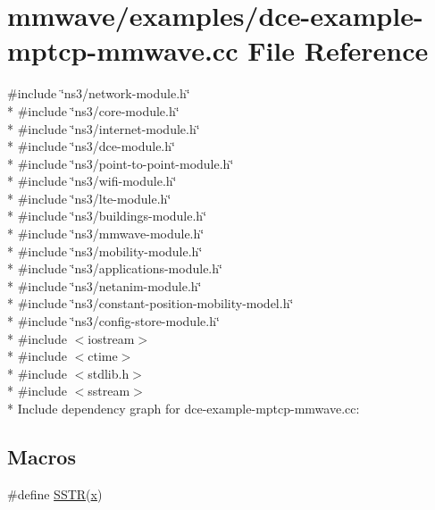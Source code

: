 \hypertarget{dce-example-mptcp-mmwave_8cc}{}\section{mmwave/examples/dce-\/example-\/mptcp-\/mmwave.cc File Reference}
\label{dce-example-mptcp-mmwave_8cc}
{\ttfamily \#include \char`\"{}ns3/network-\/module.\+h\char`\"{}}\\*
{\ttfamily \#include \char`\"{}ns3/core-\/module.\+h\char`\"{}}\\*
{\ttfamily \#include \char`\"{}ns3/internet-\/module.\+h\char`\"{}}\\*
{\ttfamily \#include \char`\"{}ns3/dce-\/module.\+h\char`\"{}}\\*
{\ttfamily \#include \char`\"{}ns3/point-\/to-\/point-\/module.\+h\char`\"{}}\\*
{\ttfamily \#include \char`\"{}ns3/wifi-\/module.\+h\char`\"{}}\\*
{\ttfamily \#include \char`\"{}ns3/lte-\/module.\+h\char`\"{}}\\*
{\ttfamily \#include \char`\"{}ns3/buildings-\/module.\+h\char`\"{}}\\*
{\ttfamily \#include \char`\"{}ns3/mmwave-\/module.\+h\char`\"{}}\\*
{\ttfamily \#include \char`\"{}ns3/mobility-\/module.\+h\char`\"{}}\\*
{\ttfamily \#include \char`\"{}ns3/applications-\/module.\+h\char`\"{}}\\*
{\ttfamily \#include \char`\"{}ns3/netanim-\/module.\+h\char`\"{}}\\*
{\ttfamily \#include \char`\"{}ns3/constant-\/position-\/mobility-\/model.\+h\char`\"{}}\\*
{\ttfamily \#include \char`\"{}ns3/config-\/store-\/module.\+h\char`\"{}}\\*
{\ttfamily \#include $<$iostream$>$}\\*
{\ttfamily \#include $<$ctime$>$}\\*
{\ttfamily \#include $<$stdlib.\+h$>$}\\*
{\ttfamily \#include $<$sstream$>$}\\*
Include dependency graph for dce-\/example-\/mptcp-\/mmwave.cc\+:
\subsection*{Macros}
\begin{DoxyCompactItemize}
\item 
\#define \hyperlink{dce-example-mptcp-mmwave_8cc_a0d2f37137ee1fd6ff4a0ef803849dd63}{S\+S\+TR}(\hyperlink{lte__link__budget__x2__handover__measures_8m_a9336ebf25087d91c818ee6e9ec29f8c1}{x})
\end{DoxyCompactItemize}
